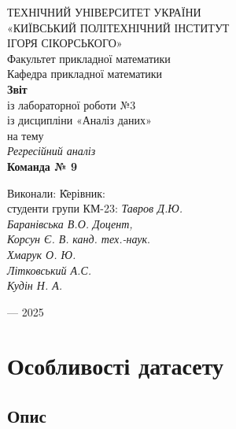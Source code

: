 \documentclass{article}
\begin{document}
\newpage 
\begin{center}
     ТЕХНІЧНИЙ УНІВЕРСИТЕТ УКРАЇНИ\\
    \Large«КИЇВСЬКИЙ ПОЛІТЕХНІЧНИЙ ІНСТИТУТ\\
     ІГОРЯ СІКОРСЬКОГО»\\
    \vspace{1cm}
    Факультет прикладної математики\\
    Кафедра прикладної математики\\
    \vspace{3cm}
    \textbf{Звіт}\\
    \vspace{0.5cm}
    із лабораторної роботи №3\\
    із дисципліни «Аналіз даних»\\
    \vspace{1cm}
    на тему\\
    \textit{Регресійний аналіз}\\
    \vspace{1.5cm}
    \textbf{Команда № 9}\\
    \vspace{2cm}
    \begin{tabbing}
        Виконали: \hspace{10cm} \= Керівник:\\
        студенти групи КМ-23: \> \textit{Тавров Д.Ю.}\\
        \textit{Баранівська В.О.} \> \textit{Доцент,}\\
        \textit{Корсун Є. В.} \> \textit{канд. тех.-наук}.\\
        \textit{Хмарук О. Ю.} \> \\
        \textit{Літковський А.С.} \>\\
        \textit{Кудін Н. А.} \> \\
    \end{tabbing}
    \vspace{3cm}
     — 2025\\
\end{center}

\newpage
\hypertarget{mytarget}{} %
\tableofcontents
\newpage
\section{Особливості датасету}
\subsection{Опис}
\end{document}
